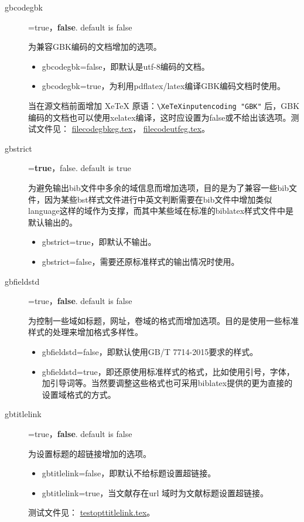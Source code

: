 \begin{description}
  \item[gbcodegbk]=true，\textbf{false}. \hfill default is false

  为兼容GBK编码的文档增加的选项。
  \begin{itemize}
    \item gbcodegbk=false，即默认是utf-8编码的文档。
    \item gbcodegbk=true，为利用pdflatex/latex编译GBK编码文档时使用。
  \end{itemize}
  当在源文档前面增加 XeTeX 原语：\lstinline!\XeTeXinputencoding "GBK"! 后，GBK编码的文档也可以使用xelatex编译，这时应设置为false或不给出该选项。测试文件见：
  \href{run:example/filecodegbkeg.tex}{filecodegbkeg.tex}，
  \href{run:example/filecodeutfeg.tex}{filecodeutfeg.tex}。

  \item[gbstrict]=\textbf{true}，false. \hfill default is true

  为避免输出bib文件中多余的域信息而增加选项，目的是为了兼容一些bib文件，因为某些bst样式文件进行中英文判断需要在bib文件中增加类似language这样的域作为支撑，而其中某些域在标准的biblatex样式文件中是默认输出的。
  \begin{itemize}
    \item gbstrict=true，即默认不输出。
    \item gbstrict=false，需要还原标准样式的输出情况时使用。
  \end{itemize}


  \item[gbfieldstd]=true，\textbf{false}. \hfill default is false

  为控制一些域如标题，网址，卷域的格式而增加选项。目的是使用一些标准样式的处理来增加格式多样性。
  \begin{itemize}
    \item gbfieldstd=false，即默认使用GB/T 7714-2015要求的样式。
    \item gbfieldstd=true，即还原使用标准样式的格式，比如使用引号，字体，加引导词等。当然要调整这些格式也可采用biblatex提供的更为直接的设置域格式的方式。
  \end{itemize}


  \item[gbtitlelink]=true，\textbf{false}. \hfill default is false

  为设置标题的超链接增加的选项。
  \begin{itemize}
    \item gbtitlelink=false，即默认不给标题设置超链接。
    \item gbtitlelink=true，当文献存在url 域时为文献标题设置超链接。
  \end{itemize}
  测试文件见：
  \href{run:example/testopttitlelink.tex}{testopttitlelink.tex}。

\end{description}


